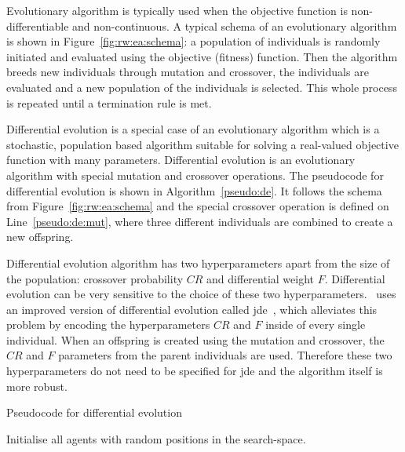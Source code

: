 \documentclass[12pt,a4paper]{report}
\begin{document}
Evolutionary algorithm is typically used when the objective function is non-differentiable and non-continuous. A typical schema of an evolutionary algorithm is shown in Figure~\ref{fig:rw:ea:schema}: a population of individuals is randomly initiated and evaluated using the objective (fitness) function. Then the algorithm breeds new individuals through mutation and crossover, the individuals are evaluated and a new population of the individuals is selected. This whole process is repeated until a termination rule is met.


Differential evolution is a special case of an evolutionary algorithm which is a stochastic, population based algorithm suitable for solving a real-valued objective function with many parameters. Differential evolution is an evolutionary algorithm with special mutation and crossover operations. The pseudocode for differential evolution is shown in Algorithm~\ref{pseudo:de}. It follows the schema from Figure~\ref{fig:rw:ea:schema} and the special crossover operation is defined on Line~\ref{pseudo:de:mut}, where three different individuals are combined to create a new offspring.

Differential evolution algorithm has two hyperparameters apart from the size of the population: crossover probability $CR$ and differential weight $F$. Differential evolution can be very sensitive to the choice of these two hyperparameters.~\citep{fukui2013evolutionary} uses an improved version of differential evolution called \acf{jde}~\citep{brest2006self}, which alleviates this problem by encoding the hyperparameters $CR$ and $F$ inside of every single individual. When an offspring is created using the mutation and crossover, the $CR$ and $F$ parameters from the parent individuals are used. Therefore these two hyperparameters do not need to be specified for \ac{jde} and the algorithm itself is more robust.

\begin{algorithm}[t]
\caption{Pseudocode for differential evolution} \label{pseudo:de}
\DontPrintSemicolon
\LinesNumbered
{}
Initialise all agents with random positions in the search-space.\;
\end{algorithm} 
\end{document}
